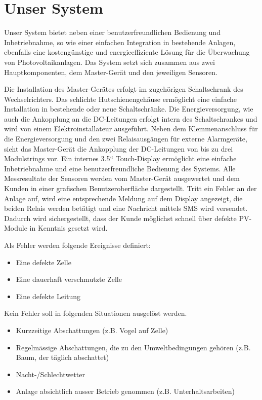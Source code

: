 \clearpage
\section{Unser System}
\label{sec:ourSystem}

Unser   System  bietet   neben   einer   benutzerfreundlichen  Bedienung   und
Inbetriebnahme,  so wie  einer  einfachen Integration  in bestehende  Anlagen,
ebenfalls  eine  kosteng\"unstige  und energieeffiziente  L\"osung  f\"ur  die
\"Uberwachung von Photovoltaikanlagen. Das System setzt sich zusammen aus zwei
Hauptkomponenten, dem Master-Ger\"at und den jeweiligen Sensoren.

Die Installation  des Master-Ger\"ates erfolgt im  zugeh\"origen Schaltschrank
des  Wechselrichters. Das  schlichte  Hutschienengeh\"ause  erm\"oglicht  eine
einfache   Installation   in   bestehende  oder   neue   Schaltschr\"anke. Die
Energieversorgung,  wie  auch  die  Ankopplung  an  die  DC-Leitungen  erfolgt
intern   des   Schaltschrankes   und  wird   von   einem   Elektroinstallateur
ausgef\"uhrt. Neben dem  Klemmenanschluss f\"ur die Energieversorgung  und den
zwei Relaisausg\"angen  f\"ur externe Alarmger\"ate, sieht  das Master-Ger\"at
die  Ankopplung  der  DC-Leitungen  von  bis  zu  drei  Modulstrings  vor. Ein
internes 3.5“ Touch-Display erm\"oglicht eine einfache Inbetriebnahme und eine
benutzerfreundliche  Bedienung des  Systems. Alle  Messresultate der  Sensoren
werden  vom Master-Ger\"at  ausgewertet  und dem  Kunden  in einer  grafischen
Benutzeroberfl\"ache  dargestellt. Tritt ein  Fehler an  der Anlage  auf, wird
eine entsprechende Meldung auf dem Display angezeigt, die beiden Relais werden
bet\"atigt  und  eine  Nachricht  mittels  SMS  wird  versendet. Dadurch  wird
sichergestellt, dass der Kunde m\"oglichst schnell \"uber defekte PV-Module in
Kenntnis gesetzt wird.

Als Fehler werden folgende Ereignisse definiert:
\begin{itemize}
    \firmlist
    \item
        Eine defekte Zelle
    \item
        Eine dauerhaft verschmutzte Zelle
    \item
        Eine defekte Leitung
\end{itemize}

Kein Fehler soll in folgenden Situationen ausgel\"ost werden.
\begin{itemize}
    \firmlist
    \item
        Kurzzeitige Abschattungen (z.B. Vogel auf Zelle)
    \item
        Regelm\"assige Abschattungen,  die zu den  Umweltbedingungen geh\"oren
        (z.B. Baum, der t\"aglich abschattet)
    \item
        Nacht-/Schlechtwetter
    \item
        Anlage absichtlich ausser Betrieb genommen (z.B. Unterhaltsarbeiten)
\end{itemize}

